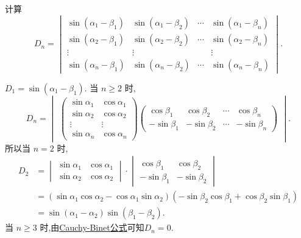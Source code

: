 \documentclass[../../main.tex]{subfiles}%
\begin{document}
\begin{example}
计算
\[
D_n = \begin{vmatrix} \sin(\alpha_1 - \beta_1) & \sin(\alpha_1 - \beta_2) & \cdots & \sin(\alpha_1 - \beta_n) \\ \sin(\alpha_2 - \beta_1) & \sin(\alpha_2 - \beta_2) & \cdots & \sin(\alpha_2 - \beta_n) \\ \vdots & \vdots & & \vdots \\ \sin(\alpha_n - \beta_1) & \sin(\alpha_n - \beta_2) & \cdots & \sin(\alpha_n - \beta_n) \end{vmatrix}.
\]
\end{example}
\begin{solution}
\(D_1 = \sin(\alpha_1 - \beta_1)\). 当 \(n \geqslant 2\) 时,
\[
D_n = \begin{vmatrix} \begin{pmatrix} \sin \alpha_1 & \cos \alpha_1 \\ \sin \alpha_2 & \cos \alpha_2 \\ \vdots & \vdots \\ \sin \alpha_n & \cos \alpha_n \end{pmatrix} \begin{pmatrix} \cos \beta_1 & \cos \beta_2 & \cdots & \cos \beta_n \\ -\sin \beta_1 & -\sin \beta_2 & \cdots & -\sin \beta_n \end{pmatrix} \end{vmatrix}.
\]
所以当 \(n = 2\) 时,
\[
\begin{aligned}
D_2 &= \begin{vmatrix} \sin \alpha_1 & \cos \alpha_1 \\ \sin \alpha_2 & \cos \alpha_2 \end{vmatrix} \cdot \begin{vmatrix} \cos \beta_1 & \cos \beta_2 \\ -\sin \beta_1 & -\sin \beta_2 \end{vmatrix} \\
&= (\sin \alpha_1 \cos \alpha_2 - \cos \alpha_1 \sin \alpha_2)(-\sin \beta_2 \cos \beta_1 + \cos \beta_2 \sin \beta_1) \\
&= \sin(\alpha_1 - \alpha_2) \sin(\beta_1 - \beta_2).
\end{aligned}
\]
当 \(n \geqslant 3\) 时,由\hyperref[theorem:Cauchy-Binet公式]{Cauchy-Binet公式}可知$D_n=0.$

\end{solution}
\end{document}
